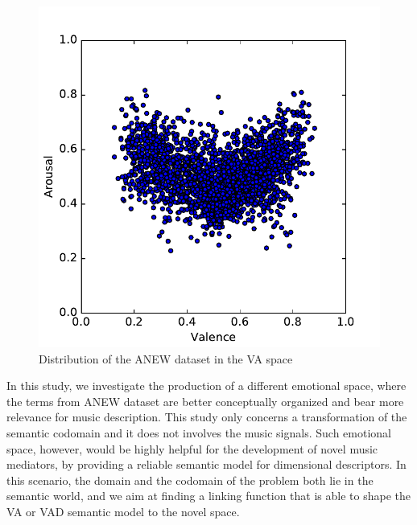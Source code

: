 \begin{figure}[bt] 
	\centering 
	\includegraphics[width=0.9\columnwidth]{img/ANEW/ANEW.pdf}
	\caption{Distribution of the ANEW dataset in the VA space}
	\label{fig:ANEW:ANEW}
\end{figure}	

In this study, we investigate the production of a different emotional space, where the terms from ANEW dataset are better conceptually organized and bear more relevance for music description. This study only concerns a transformation of the semantic codomain and it does not involves the music signals. Such emotional space, however, would be highly helpful for the development of novel music mediators, by providing a reliable semantic model for dimensional descriptors. In this scenario, the domain and the codomain of the problem both lie in the semantic world, and we aim at finding a linking function that is able to shape the VA or VAD semantic model to the novel space.

